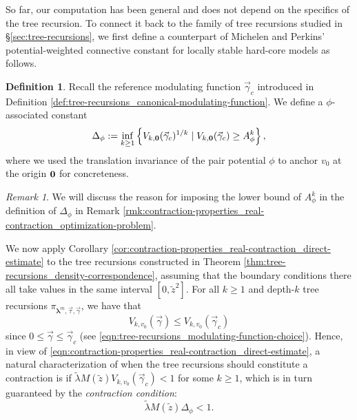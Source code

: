 \documentclass[11pt]{article}
\newcommand{\bl}{\bm{\lambda}}
\newcommand{\pwcc}{\Delta_{\phi}}
\newcommand{\tl}{\tilde{\lambda}}
\newcommand{\tz}{\tilde{z}}
\newcommand{\aconst}{A_{\phi}}
\newcommand{\set}[1]{\left\{#1\right\}}
\numberwithin{equation}{section}
\theoremstyle{plain}
\theoremstyle{definition}
\newtheorem{definition}[theorem]{Definition}
\theoremstyle{remark}
\newtheorem{remark}[theorem]{Remark}
\begin{document}
So far, our computation has been general and does not depend on the specifics of the tree recursion.
To connect it back to the family of tree recursions studied in \S\ref{sec:tree-recursions}, we first define a counterpart of Michelen and Perkins' potential-weighted connective constant \cite[Definition 2]{michelen2023analyticity} for locally stable hard-core models as follows.

\begin{definition}
\label{def:tree-recursions_pwcc}
Recall the reference modulating function $\vec{\gamma}_{c}$ introduced in Definition \ref{def:tree-recursions_canonical-modulating-function}.
We define a $\phi$-associated constant
\begin{equation}
\label{eqn:tree-recursions_pwcc}
\pwcc:=\inf_{k\ge 1}\set{V_{k,\vb{0}}(\vec{\gamma}_{c})^{1/k}\mid V_{k,\vb{0}}(\vec{\gamma}_{c})\ge\aconst^{k}},
\end{equation}
where we used the translation invariance of the pair potential $\phi$ to anchor $v_{0}$ at the origin $\vb{0}$ for concreteness.
\end{definition}

\begin{remark}
We will discuss the reason for imposing the lower bound of $\aconst^{k}$ in the definition of $\pwcc$ in Remark \ref{rmk:contraction-properties_real-contraction_optimization-problem}.
\end{remark}

We now apply Corollary \ref{cor:contraction-properties_real-contraction_direct-estimate} to the tree recursions constructed in Theorem \ref{thm:tree-recursions_density-correspondence}, assuming that the boundary conditions there all take values in the same interval $[0,\tz^{2}]$.
For all $k\ge 1$ and depth-$k$ tree recursions $\pi_{\bl^{m},\vec{\tau},\vec{\gamma}}$, we have that 
\begin{equation}
\label{eqn:contraction-properties_real-contraction_Vk-domination}
V_{k,v_{0}}(\vec{\gamma})\le V_{k,v_{0}}(\vec{\gamma}_{c})
\end{equation}
since $0\le\vec{\gamma}\le\vec{\gamma}_{c}$ (see \eqref{eqn:tree-recursions_modulating-function-choice}).
Hence, in view of \eqref{eqn:contraction-properties_real-contraction_direct-estimate}, a natural characterization of when the tree recursions should constitute a contraction is if $\tl M(\tz)V_{k,v_{0}}(\vec{\gamma}_{c})<1$ for some $k\ge 1$, which is in turn guaranteed by the \emph{contraction condition}:
\begin{equation}
\label{eqn:contraction-properties_real-contraction_contraction-condition}
\tl M(\tz)\pwcc<1.
\end{equation}
\end{document}
